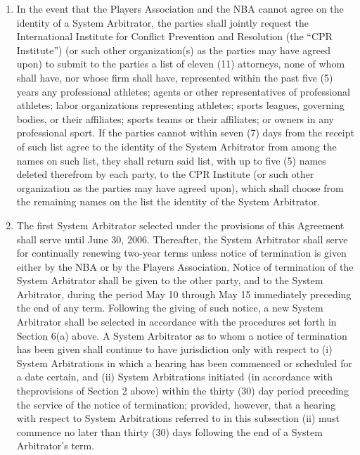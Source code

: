 \documentclass[
]{book}
\providecommand{\tightlist}{%
  \setlength{\itemsep}{0pt}\setlength{\parskip}{0pt}}
\begin{document}
\begin{enumerate}
\def\labelenumi{(\alph{enumi})}
\tightlist
\item
  In the event that the Players Association and the NBA cannot agree on the identity of a System Arbitrator, the parties shall jointly request the International Institute for Conflict Prevention and Resolution (the ``CPR Institute'') (or such other organization(s) as the parties may have agreed upon) to submit to the parties a list of eleven (11) attorneys, none of whom shall have, nor whose firm shall have, represented within the past five (5) years any professional athletes; agents or other representatives of professional athletes; labor organizations representing athletes; sports leagues, governing bodies, or their affiliates; sports teams or their affiliates; or owners in any professional sport. If the parties cannot within seven (7) days from the receipt of such list agree to the identity of the System Arbitrator from among the names on such list, they shall return said list, with up to five (5) names deleted therefrom by each party, to the CPR Institute (or such other organization as the parties may have agreed upon), which shall choose from the remaining names on the list the identity of the System Arbitrator.
\item
  The first System Arbitrator selected under the provisions of this Agreement shall serve until June 30, 2006. Thereafter, the System Arbitrator shall serve for continually renewing two-year terms unless notice of termination is given either by the NBA or by the Players Association. Notice of termination of the System Arbitrator shall be given to the other party, and to the System Arbitrator, during the period May 10 through May 15 immediately preceding the end of any term. Following the giving of such notice, a new System Arbitrator shall be selected in accordance with the procedures set forth in Section 6(a) above. A System Arbitrator as to whom a notice of termination has been given shall continue to have jurisdiction only with respect to (i) System Arbitrations in which a hearing has been commenced or scheduled for a date certain, and (ii) System Arbitrations initiated (in accordance with theprovisions of Section 2 above) within the thirty (30) day period preceding the service of the notice of termination; provided, however, that a hearing with respect to System Arbitrations referred to in this subsection (ii) must commence no later than thirty (30) days following the end of a System Arbitrator's term.
\end{enumerate}
\end{document}
